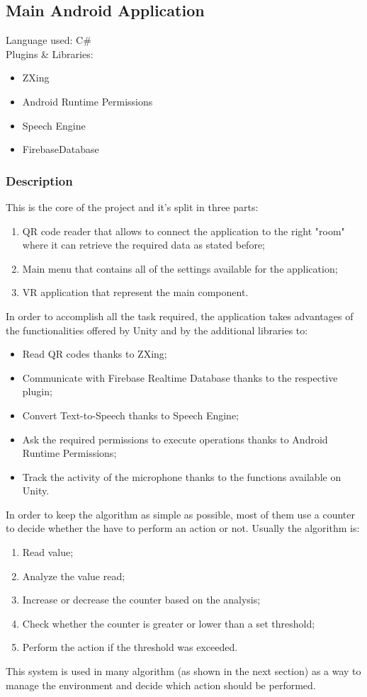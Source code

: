 \subsection{Main Android Application}
Language used: C\#\\
Plugins \& Libraries:
\begin{itemize}
	\item ZXing
	\item Android Runtime Permissions
	\item Speech Engine
	\item FirebaseDatabase
\end{itemize}

\subsubsection{Description}
This is the core of the project and it's split in three parts:
\begin{enumerate}
	\item QR code reader that allows to connect the application to the right "room" where it can retrieve the required data as stated before;
	\item Main menu that contains all of the settings available for the application;
	\item VR application that represent the main component.
\end{enumerate}

In order to accomplish all the task required, the application takes advantages of the functionalities offered by Unity and by the additional libraries to:
\begin{itemize}
	\item Read QR codes thanks to ZXing;
	\item Communicate with Firebase Realtime Database thanks to the respective plugin;
	\item Convert Text-to-Speech thanks to Speech Engine;
	\item Ask the required permissions to execute operations thanks to Android Runtime Permissions;
	\item Track the activity of the microphone thanks to the functions available on Unity.
\end{itemize} 

In order to keep the algorithm as simple as possible, most of them use a counter to decide whether the have to perform an action or not. Usually the algorithm is:
\begin{enumerate}
	\item Read value;
	\item Analyze the value read;
	\item Increase or decrease the counter based on the analysis;
	\item Check whether the counter is greater or lower than a set threshold;
	\item Perform the action if the threshold was exceeded.
\end{enumerate}
This system is used in many algorithm (as shown in the next section) as a way to manage the environment and decide which action should be performed.

